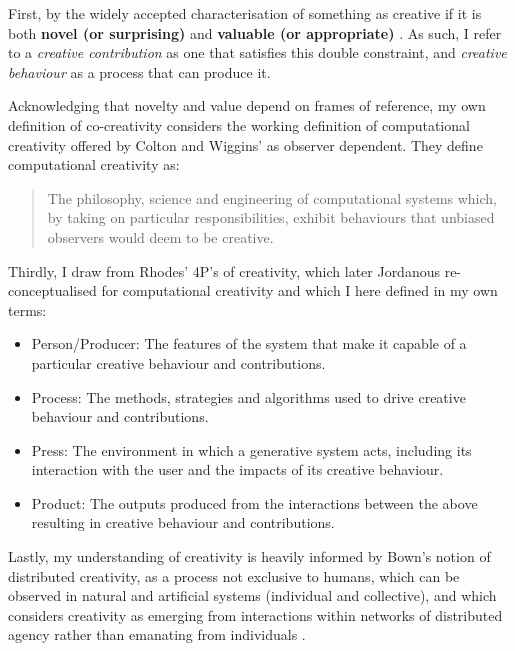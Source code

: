 First, by the widely accepted characterisation of something as creative if it is both \textbf{novel (or surprising)} and \textbf{valuable (or appropriate)} \cite{Amabile1983-lj, Sternberg1998-oz, Runco2012-mk, Boden2003-hk}. As such, I refer to a \textit{creative contribution} as one that satisfies this double constraint, and \textit{creative behaviour} as a process that can produce it. 

Acknowledging that novelty and value depend on frames of reference, my own definition of co-creativity considers the working definition of computational creativity offered by Colton and Wiggins' \cite{Colton2021-bt} as observer dependent.  They define computational creativity as:

\begin{quote}
The philosophy, science and engineering of computational systems which, by taking on particular responsibilities, exhibit behaviours that unbiased observers would deem to be creative.
\end{quote}
 
Thirdly, I draw from Rhodes' \cite{Rhodes1961-od} 4P's of creativity, which later Jordanous re-conceptualised for computational creativity \cite{Jordanous2016-xb} and which I here defined in my own terms: 

\begin{itemize}
    \item Person/Producer: The features of the system that make it capable of a particular creative behaviour and contributions.
    \item Process: The methods, strategies and algorithms used to drive creative behaviour and contributions.
    \item Press: The environment in which a generative system acts, including its interaction with the user and the impacts of its creative behaviour.
    \item Product: The outputs produced from the interactions between the above resulting in creative behaviour and contributions.
\end{itemize}

Lastly, my understanding of creativity is heavily informed by Bown's notion of distributed creativity, as a process not exclusive to humans, which can be observed in natural and artificial systems (individual and collective), and which considers creativity as emerging from interactions within networks of distributed agency rather than emanating from individuals \cite{Bown2012-gg, Bown2021-os}. 

